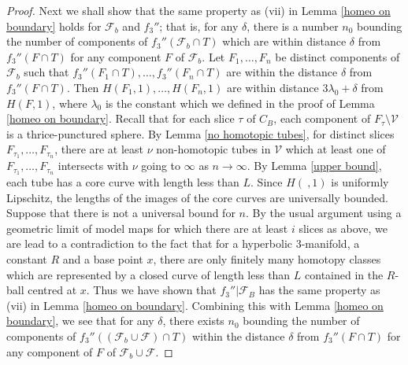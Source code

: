 \documentclass{amsart}
\theoremstyle{definition}
\numberwithin{figure}{section}
\numberwithin{equation}{section}
\def\cv{\mathcal{V}}
\begin{document}
\begin{proof}
Next we shall show that the same property as (vii) in Lemma \ref{homeo on boundary} holds for $\mathcal F_b$ and $f_3''$; that is, 
for any $\delta$, there is a number $n_0$ bounding the number of components of $f_3''(\mathcal F_b \cap T)$ which are within distance $\delta$ from $f_3''(F \cap T)$ for any component $F$ of $\mathcal F_b$.
Let $F_1, \dots ,F_n$ be distinct components of $\mathcal F_b$ such that $f_3''(F_1 \cap T), \dots , f_3''(F_n \cap T)$ are within the distance $\delta$ from $f_3''(F \cap T)$.
Then $H(F_1,1), \dots , H(F_n,1)$ are within distance $3\lambda_0+\delta$ from $H(F,1)$, where $\lambda_0$ is the constant which we defined in the proof of Lemma \ref{homeo on boundary}.
Recall that for each slice $\tau$ of $C_B$, each component of $F_\tau \setminus \cv$ is a thrice-punctured sphere.
By Lemma \ref{no homotopic tubes}, for distinct slices $F_{\tau_1}, \dots, F_{\tau_n}$, there are at least $\nu$ non-homotopic tubes in $\cv$ which at least one of $F_{\tau_1}, \dots , F_{\tau_n}$ intersects with $\nu$ going to $\infty$ as $n \rightarrow \infty$.
By Lemma \ref{upper bound}, each tube has a core curve with length less than $L$.
Since $H(\ , 1)$ is uniformly Lipschitz, the lengths of the images of the core curves are universally  bounded.
Suppose that there is not a universal bound for $n$.
By the usual argument using a geometric limit of model maps for which there are at least $i$ slices as above, we are lead to a contradiction to the fact that for a hyperbolic 3-manifold, a constant $R$ and a base point $x$, there are only finitely many homotopy classes which are represented by a closed curve of length less than $L$ contained in the $R$-ball centred at $x$.
Thus we have shown that $f_3''|\mathcal F_B$ has the same property as (vii) in Lemma \ref{homeo on boundary}.
Combining this with Lemma \ref{homeo on boundary}, we see that for any $\delta$, there exists $n_0$ bounding the number of components of $f_3''((\mathcal F_b \cup \mathcal F)\cap T)$  within the distance $\delta$ from $f_3''(F\cap T)$ for any component of $F$ of $\mathcal F_b \cup \mathcal F$.





\end{proof}
\end{document}
